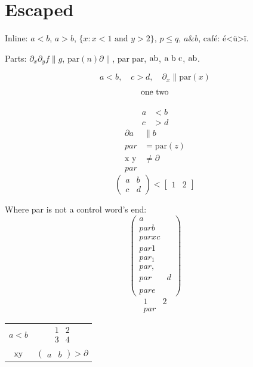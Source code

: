 \documentclass{article}
\newcommand{\parity}[1]{\mathrm{par}(#1)}
\begin{document}
\section{Escaped}
Inline: $a<b$, $a>b$, $\{x : x<1 \text{ and } y>2\}$, \(p \le q\), $a \& b$,
$\text{caf\'e: é<ü>ï}$.

Parts: $\partial_x \partial_y f \parallel g$, $\parity{n} \partial\parallel$,
$\mathrm{par} \; \text{par}$, $\mbox{a\par b}$, $\mbox{a \par b \par c}$,
$\mbox{a\par\par b}$.

\[ a<b, \quad c>d, \quad \partial_x \parallel \parity{x} \]
\[ \mbox{one \par two} \]

\begin{align}
  a &< b \\
  c &> d
\end{align}
\begin{align*}
  \partial a &\parallel b \\par &= \parity{z} \\
  \text{x y} &\ne \partial \\par
\end{align*}
\begin{equation}
  \begin{pmatrix} a & b \\ c & d \end{pmatrix} < \begin{bmatrix} 1 & 2 \end{bmatrix}
\end{equation}

Where par is not a control word's end:
\[ \begin{pmatrix} a \\par b \\parx c \\par1 \\par_1 \\par, \\par& d \\\\par e \end{pmatrix} \]
\[ \begin{smallmatrix} 1 & 2 \\par\end{smallmatrix} \]

\begin{tabular}{cc}
  $a<b$ & $\begin{smallmatrix} 1 & 2 \\ 3 & 4 \end{smallmatrix}$ \\
  $\mbox{x\par y}$ & $\begin{pmatrix} a & b \end{pmatrix} > \partial$
\end{tabular}
\end{document}
